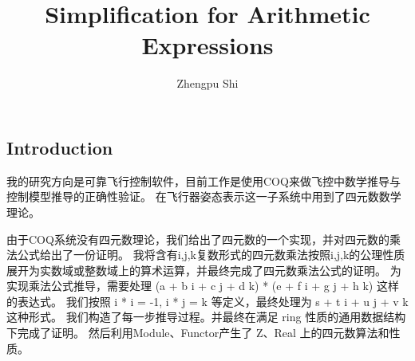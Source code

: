 \documentclass{article} %
\title{Simplification for Arithmetic Expressions}
\author{Zhengpu Shi}
\affil{V1.0}
\numberwithin{equation}{section} %
\begin{document}
\maketitle





\subsection{Introduction}
我的研究方向是可靠飞行控制软件，目前工作是使用COQ来做飞控中数学推导与控制模型推导的正确性验证。
在飞行器姿态表示这一子系统中用到了四元数数学理论。

由于COQ系统没有四元数理论，我们给出了四元数的一个实现，并对四元数的乘法公式给出了一份证明。
我将含有i,j,k复数形式的四元数乘法按照i,j,k的公理性质展开为实数域或整数域上的算术运算，并最终完成了四元数乘法公式的证明。
为实现乘法公式推导，需要处理 (a + b i + c j + d k) * (e + f i + g j + h k) 这样的表达式。
我们按照 i * i = -1, i * j = k 等定义，最终处理为 s + t i + u j + v k 这种形式。
我们构造了每一步推导过程。并最终在满足 ring 性质的通用数据结构下完成了证明。
然后利用Module、Functor产生了 Z、Real 上的四元数算法和性质。
\end{document}
